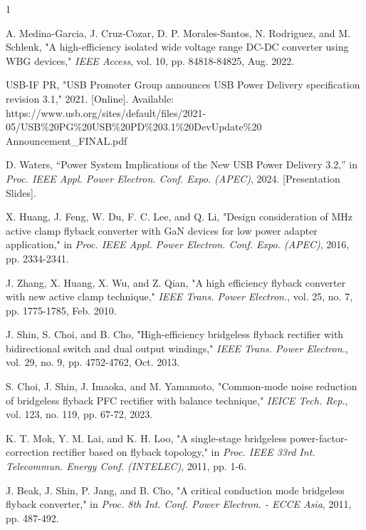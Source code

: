 \documentclass[lettersize,journal]{IEEEtran}
\begin{document}






\begin{thebibliography}{1}


A. Medina-Garcia, J. Cruz-Cozar, D. P. Morales-Santos, N. Rodriguez, and M. Schlenk, "A high-efficiency isolated wide voltage range DC-DC converter using WBG devices," \textit{IEEE Access}, vol. 10, pp. 84818-84825, Aug. 2022.

USB-IF PR, "USB Promoter Group announces USB Power Delivery specification revision 3.1," 2021. [Online]. Available: https://www.usb.org/sites/default/files/2021-05/USB\%20PG\%20USB\%20PD\%203.1\%20DevUpdate\%20\\Announcement\_FINAL.pdf

D. Waters, ``Power System Implications of the New USB Power Delivery 3.2,'' in \textit{Proc. IEEE Appl. Power Electron. Conf. Expo. (APEC)}, 2024. [Presentation Slides].

X. Huang, J. Feng, W. Du, F. C. Lee, and Q. Li, "Design consideration of MHz active clamp flyback converter with GaN devices for low power adapter application," in \textit{Proc. IEEE Appl. Power Electron. Conf. Expo. (APEC)}, 2016, pp. 2334-2341.

J. Zhang, X. Huang, X. Wu, and Z. Qian, "A high efficiency flyback converter with new active clamp technique," \textit{IEEE Trans. Power Electron.}, vol. 25, no. 7, pp. 1775-1785, Feb. 2010.


J. Shin, S. Choi, and B. Cho, "High-efficiency bridgeless flyback rectifier with bidirectional switch and dual output windings," \textit{IEEE Trans. Power Electron.}, vol. 29, no. 9, pp. 4752-4762, Oct. 2013.

S. Choi, J. Shin, J. Imaoka, and M. Yamamoto, "Common-mode noise reduction of bridgeless flyback PFC rectifier with balance technique," \textit{IEICE Tech. Rep.}, vol. 123, no. 119, pp. 67-72, 2023.

K. T. Mok, Y. M. Lai, and K. H. Loo, "A single-stage bridgeless power-factor-correction rectifier based on flyback topology," in \textit{Proc. IEEE 33rd Int. Telecommun. Energy Conf. (INTELEC)}, 2011, pp. 1-6.

J. Beak, J. Shin, P. Jang, and B. Cho, "A critical conduction mode bridgeless flyback converter," in \textit{Proc. 8th Int. Conf. Power Electron. - ECCE Asia}, 2011, pp. 487-492.


\end{thebibliography}
\end{document}
